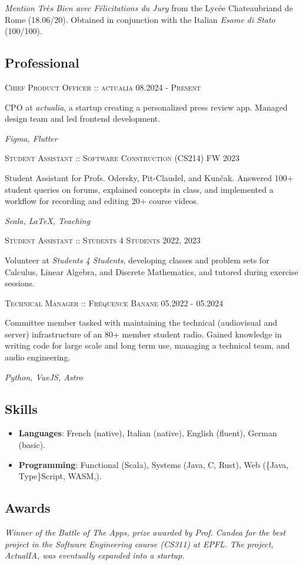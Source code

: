 \documentclass[10pt]{article}
\renewcommand{\line}[2]{{\vspace{4pt} \large \noindent\textsc{#1} \hfill \small{#2}}\vspace{4pt}}
\begin{document}
  \textit{Mention Très Bien avec Félicitations du Jury} from the Lycée Chateaubriand de Rome (18.06/20). Obtained in conjunction with the Italian \textit{Esame di Stato} (100/100).

  \subsection*{Professional}

  \line{Chief Product Officer :: actualia}{08.2024 - \textsc{Present}}

  CPO at \textit{actualia}, a startup creating a personalized press review app. Managed design team and led frontend development.

  \textit{Figma, Flutter}

  \line{Student Assistant :: Software Construction (CS214)}{FW 2023}

  Student Assistant for Profs. Odersky, Pit-Claudel, and Kunčak. Answered 100+ student queries on forums, explained concepts in class, and implemented a workflow for recording and editing 20+ course videos.

  \textit{Scala, LaTeX, Teaching}

  \line{Student Assistant :: Students 4 Students}{2022, 2023}

  Volunteer at \textit{Students 4 Students}, developing classes and problem sets for Calculus, Linear Algebra, and Discrete Mathematics, and tutored during exercise sessions.

  \line{Technical Manager :: Fréquence Banane}{05.2022 - 05.2024}

  Committee member tasked with maintaining the technical (audiovisual and server) infrastructure of an 80+ member student radio. Gained knowledge in writing code for large scale and long term use, managing a technical team, and audio engineering.

  \textit{Python, VueJS, Astro}

  \subsection*{Skills}

  \begin{adjustwidth}{}{}
    \begin{itemize}
      \item[] \textbf{Languages}: French (native), Italian (native), English (fluent), German (basic).
      \item[] \textbf{Programming}: Functional (Scala), Systems (Java, C, Rust), Web (\{Java, Type\}Script, WASM,).
    \end{itemize}
  \end{adjustwidth}

  \subsection*{Awards}

  \textit{Winner of the Battle of The Apps, prize awarded by Prof. Candea for the best project in the Software Engineering course (CS311) at EPFL. The project, ActualIA, was eventually expanded into a startup.}
\end{document}

